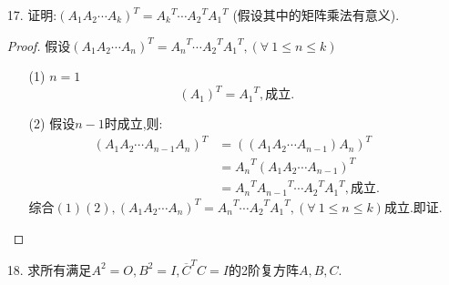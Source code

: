 \documentclass{article}
\begin{document}
\begin{enumerate}
        \item [17.]证明:${(A_1 A_2 \cdots A_k)}^{T}={A_k}^T \cdots {A_2}^T {A_1}^T$ (假设其中的矩阵乘法有意义).
        \begin{proof}
            假设${(A_1 A_2 \cdots A_n)}^{T}={A_n}^T \cdots {A_2}^T {A_1}^T,(\forall \ 1\leq n \leq k)$
            \begin{enumerate}
                \item [(1)]$n=1$
                \[{(A_1)}^T={A_1}^T,\mbox{成立}.\]
                \item [(2)]假设$n-1$时成立,则:
                \begin{align*}
                    {(A_1 A_2 \cdots A_{n-1} A_n)}^T 
                    &= {((A_1 A_2\cdots A_{n-1})A_n)}^{T}\\
                    &={A_n}^T {(A_1 A_2 \cdots A_{n-1})}^T\\
                    &={A_n}^T {A_{n-1}}^T \cdots {A_2}^T {A_1}^T,\mbox{成立}.
                \end{align*}
                综合$(1)(2),{(A_1 A_2 \cdots A_n)}^{T}={A_n}^T \cdots {A_2}^T {A_1}^T,(\forall \ 1\leq n \leq k)$成立.即证.
            \end{enumerate}
        \end{proof}
        \item [18.]求所有满足$A^2=O,B^2=I,{\overline{C}}^{T}C=I$的2阶复方阵$A,B,C$.
        

\end{enumerate}
\end{document}
